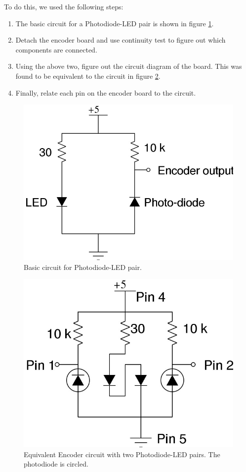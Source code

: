 \documentclass[10pt,a4paper]{article}
\begin{document}
To do this, we used the following steps:
\begin{enumerate}
\item The basic circuit for a Photodiode-LED pair is shown in figure
  \ref{fig:photodiodeLEDPair}. 
\item Detach the encoder board and use continuity test to figure out
  which components are connected.
\item Using the above two, figure out the circuit diagram of the
  board. This was found to be equivalent to the circuit in figure
  \ref{fig:encoderCircuit}. 
\item Finally, relate each pin on the encoder board to the
  circuit. 
\end{enumerate}

\begin{figure}[H]
    \centering
    \includegraphics[scale=0.5]{SimpleEncoder.jpg}
    \caption{Basic circuit for Photodiode-LED pair.}
    \label{fig:photodiodeLEDPair}
\end{figure}

\begin{figure}[H]
    \centering
    \includegraphics[scale=0.5]{EncoderCircuit.jpg}
    \caption{Equivalent Encoder circuit with two Photodiode-LED
      pairs. The photodiode is circled.}
    \label{fig:encoderCircuit}
\end{figure}
\end{document}
